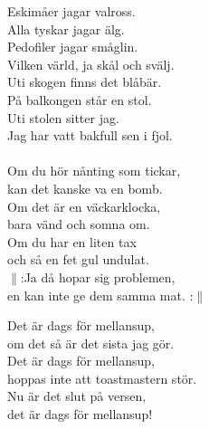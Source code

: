 \documentclass[a6paper,10pt]{article}
\begin{document}
\setlength{\oddsidemargin}{-0.37in}
\begin{center}
\end{center}
\begin{lyrics}
\small Eskimåer jagar valross.\\
Alla tyskar jagar älg.\\
Pedofiler jagar småglin.\\
Vilken värld, ja skål och svälj.
\vspace{5pt}\\
Uti skogen finns det blåbär.\\
På balkongen står en stol.\\
Uti stolen sitter jag.\\
Jag har vatt bakfull sen i fjol.\\
\vspace{5pt}\\
Om du hör nånting som tickar,\\
kan det kanske va en bomb.\\
Om det är en väckarklocka,\\
bara vänd och somna om.\\
Om du har en liten tax\\
och så en fet gul undulat.\\
$\|$:Ja då hopar sig problemen,\\
en kan inte ge dem samma mat. :$\|$
\end{lyrics}
\begin{center}
\end{center}
\begin{lyrics}
\small Det är dags för mellansup,\\
om det så är det sista jag gör.\\
Det är dags för mellansup,\\ 
hoppas inte att toastmastern stör.\\
Nu är det slut på versen,\\
det är dags för mellansup!
\end{lyrics}
\end{document}
